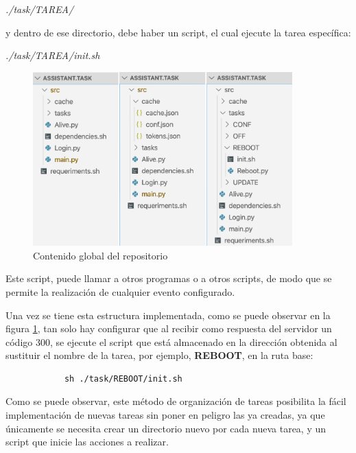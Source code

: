         \begin{center}
            \textit{./task/TAREA/}
        \end{center}
        y dentro de ese directorio, debe haber un script, el cual ejecute la tarea específica:
        
        \begin{center}
            \textit{./task/TAREA/init.sh}
        \end{center}
        
        \begin{figure}[h!]
            \centering
            \includegraphics[width=10cm]{./img/arch/device/src.task.png}
            \caption{Contenido global del repositorio}
            \label{fig:src.task}
        \end{figure}
        
        Este script, puede llamar a otros programas o a otros scripts, de modo que se permite la realización de cualquier evento configurado.
        
        Una vez se tiene esta estructura implementada, como se puede observar en la figura \ref{fig:src.task}, tan solo hay configurar que al recibir como respuesta del servidor un código 300, se ejecute el script que está almacenado en la dirección obtenida al sustituir el nombre de la tarea, por ejemplo, \textbf{REBOOT}, en la ruta base:
        
        \begin{lstlisting}
            sh ./task/REBOOT/init.sh
        \end{lstlisting}
        
        Como se puede observar, este método de organización de tareas posibilita la fácil implementación de nuevas tareas sin poner en peligro las ya creadas, ya que únicamente se necesita crear un directorio nuevo por cada nueva tarea, y un script que inicie las acciones a realizar.
        
